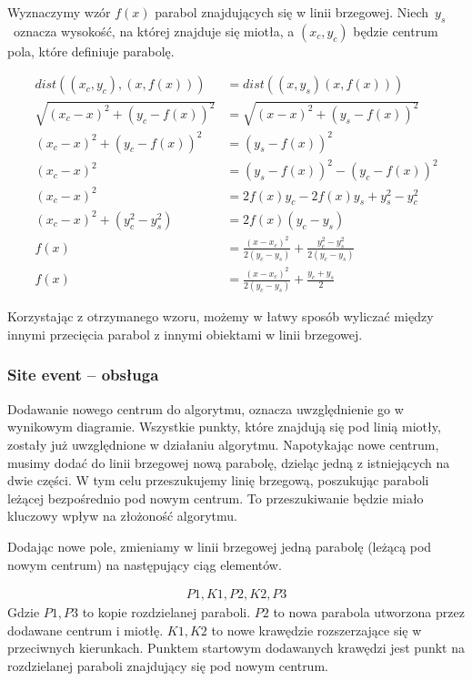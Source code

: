 \documentclass[declaration,shortabstract, inz]{iithesis}
\theoremstyle{definition} \newtheorem{definition}{Definicja}[]
\theoremstyle{plain} \newtheorem{remark}[definition]{Obserwacja}
\theoremstyle{plain} \newtheorem{theorem}[definition]{Twierdzenie}
\theoremstyle{plain} \newtheorem{example}{Przykład}[definition]
\theoremstyle{plain} \newtheorem{lemma}[definition]{Lemat}
\begin{document}
Wyznaczymy wzór $f(x)$ parabol znajdujących się w linii brzegowej.
Niech~$y_s$~oznacza wysokość, na której znajduje się miotła, a $(x_c, y_c)$ będzie centrum pola, które definiuje parabolę. 

\begin{align*}
	dist((x_c, y_c), (x, f(x))) &= dist((x, y_s) (x, f(x))) \\
	\sqrt{(x_c - x)^2 + (y_c - f(x))^2} &= \sqrt{(x - x)^2 + (y_s - f(x))^2} \\
	(x_c - x)^2 + (y_c - f(x))^2 &= (y_s - f(x))^2 \\
	(x_c - x)^2 &= (y_s - f(x))^2 - (y_c - f(x))^2 \\ 
	(x_c - x)^2 &= 2f(x)y_c - 2f(x)y_s + y_s^2 - y_c^2 \\
	(x_c - x)^2 + (y_c^2 - y_s^2) &= 2f(x)(y_c - y_s) \\
	f(x) &= \frac{(x - x_c)^2}{2(y_c - y_s)} + \frac{y_c^2 - y_s^2}{2(y_c - y_s)} \\
	f(x) &= \frac{(x - x_c)^2}{2(y_c - y_s)} + \frac{y_c + y_s}{2}
\end{align*}

Korzystając z otrzymanego wzoru, możemy w łatwy sposób wyliczać między innymi przecięcia parabol z innymi obiektami w linii brzegowej.

\subsubsection{Site event -- obsługa}
\label{sec:site}
Dodawanie nowego centrum do algorytmu, oznacza uwzględnienie go w wynikowym diagramie. Wszystkie punkty, które znajdują się pod linią miotły, zostały już uwzględnione w działaniu algorytmu. Napotykając nowe centrum, musimy dodać do linii brzegowej nową parabolę, dzieląc jedną z istniejących na dwie części. W tym celu przeszukujemy linię brzegową, poszukując paraboli leżącej bezpośrednio pod nowym centrum. To przeszukiwanie będzie miało kluczowy wpływ na złożoność algorytmu. 

Dodając nowe pole, zmieniamy w linii brzegowej jedną parabolę (leżącą pod nowym centrum) na następujący ciąg elementów.

\begin{align}
 	P1, K1, P2, K2, P3
\end{align}
Gdzie $P1, P3$ to kopie rozdzielanej paraboli. $P2$ to nowa parabola utworzona przez dodawane centrum i miotłę. $K1, K2$ to nowe krawędzie rozszerzające się w przeciwnych kierunkach. Punktem startowym dodawanych krawędzi jest punkt na rozdzielanej paraboli znajdujący się pod nowym centrum.
\end{document}
